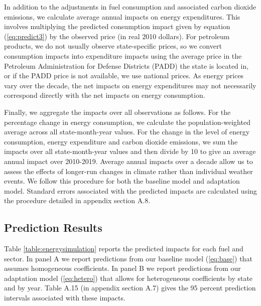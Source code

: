 \documentclass[11pt]{article}
\begin{document}
In addition to the adjustments in fuel consumption and associated carbon dioxide emissions, we calculate average annual impacts on energy expenditures. This involves multiplying the predicted consumption impact given by equation (\ref{eq:predict3}) by the observed price (in real 2010 dollars). For petroleum products, we do not usually observe state-specific prices, so we convert consumption impacts into expenditure impacts using the average price in the Petroleum Administration for Defense Districts (PADD) the state is located in, or if the PADD price is not available, we use national prices. As energy prices vary over the decade, the net impacts on energy expenditures may not necessarily correspond directly with the net impacts on energy consumption.
 
Finally, we aggregate the impacts over all observations as follows. For the percentage change in energy consumption, we calculate the population-weighted average across all state-month-year values. For the change in the level of energy consumption, energy expenditure and carbon dioxide emissions, we sum the impacts over all state-month-year values and then divide by 10 to give an average annual impact over 2010-2019. Average annual impacts over a decade allow us to assess the effects of longer-run changes in climate rather than individual weather events. We follow this procedure for both the baseline model and adaptation model. Standard errors associated with the predicted impacts are calculated using the procedure detailed in appendix section A.8. 

\subsection{Prediction Results}

Table \ref{table:energysimulation} reports the predicted impacts for each fuel and sector. In panel A we report predictions from our baseline model (\ref{eq:base}) that assumes homogeneous coefficients. In panel B we report predictions from our adaptation model (\ref{eq:hetero}) that allows for heterogeneous coefficients by state and by year. Table A.15 (in appendix section A.7) gives the 95 percent prediction intervals associated with these impacts. 
\end{document}

